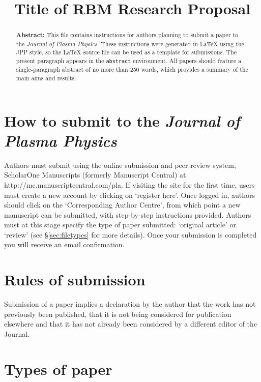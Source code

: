 \documentclass[12pt]{RBM_P}
\title{Title of RBM Research Proposal}
\begin{document}

\doublespacing

\maketitle

\begin{abstract}
\textbf{Abstract: } This file contains instructions for authors planning to submit a paper to the \textit{Journal of Plasma Physics}. These instructions were generated in {\LaTeX} using the JPP style, so the {\LaTeX} source file can be used as a template for submissions. The present paragraph appears in the \verb|abstract| environment. All papers should feature a single-paragraph abstract of no more than 250 words, which provides a summary of the main aims and results.
\end{abstract}



\section{How to submit to the \textbf{\textit{Journal of Plasma Physics}}}
Authors must submit using the online submission and peer review system, ScholarOne Manuscripts (formerly Manuscript Central) at http://mc.manuscriptcentral.com/pla. If visiting the site for the first time, users must create a new account by clicking on `register here'. Once logged in, authors should click on the `Corresponding Author Centre', from which point a new manuscript can be submitted, with step-by-step instructions provided. Authors must at this stage specify the type of paper submitted: `original article' or `review' (see \S\ref{sec:filetypes} for more details). Once your submission is completed you will receive an email confirmation.
 
\section{Rules of submission}\label{sec:rules_submission}
Submission of a paper implies a declaration by the author that the work has not previously been published, that it is not being considered for publication elsewhere and that it has not already been considered by a different editor of the Journal.

\section{Types of paper}\label{sec:types_paper}
\end{document}

